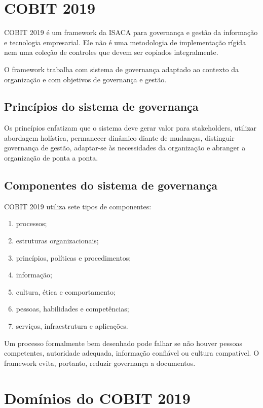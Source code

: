\section{COBIT 2019}

COBIT 2019 é um framework da ISACA para governança e gestão da informação e tecnologia empresarial. Ele não é uma metodologia de implementação rígida nem uma coleção de controles que devem ser copiados integralmente.

O framework trabalha com sistema de governança adaptado ao contexto da organização e com objetivos de governança e gestão.

\subsection{Princípios do sistema de governança}

Os princípios enfatizam que o sistema deve gerar valor para stakeholders, utilizar abordagem holística, permanecer dinâmico diante de mudanças, distinguir governança de gestão, adaptar-se às necessidades da organização e abranger a organização de ponta a ponta.

\subsection{Componentes do sistema de governança}

COBIT 2019 utiliza sete tipos de componentes:
\begin{enumerate}
\item processos;
\item estruturas organizacionais;
\item princípios, políticas e procedimentos;
\item informação;
\item cultura, ética e comportamento;
\item pessoas, habilidades e competências;
\item serviços, infraestrutura e aplicações.
\end{enumerate}

Um processo formalmente bem desenhado pode falhar se não houver pessoas competentes, autoridade adequada, informação confiável ou cultura compatível. O framework evita, portanto, reduzir governança a documentos.

\section{Domínios do COBIT 2019}

